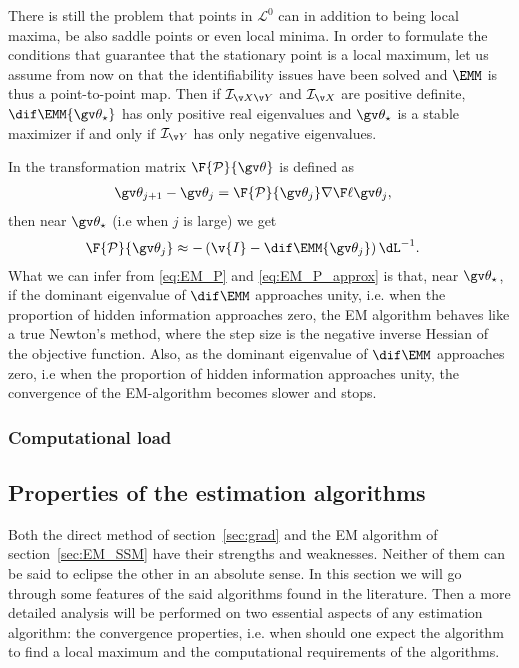 There is still the problem that points in $\mathcal{L}^0$ can in addition
to being local maxima, be also saddle points or even local minima. In order to formulate
the conditions that guarantee that the stationary point is a local maximum, let us assume
from now on that the identifiability issues have been solved and $\EMM$ is thus a point-to-point map.
Then if $\mathcal{I}_{\X\Y}$ and $\mathcal{I}_{\X}$ are positive definite,
$\dif\EMM{\Th_\star}$ has only positive real eigenvalues and $\Th_\star$ is a
stable maximizer if and only if $\mathcal{I}_{\Y}$ has only negative eigenvalues.

In \textcite{Salakhutdinov2003,Salakhutdinov2004} the transformation matrix $\F{\mathcal P}{\Th}$ is defined as
\begin{align}
	\Th_{j+1}-\Th_j &= \F{\mathcal P}{\Th_j}\nabla\lLH[\Th_j],
	\label{eq:EM_P}
\end{align}
then near $\Th_\star$ (i.e when $j$ is large)
we get
\begin{align}
		\F{\mathcal P}{\Th_j}&\approx -\left(\v{I}-\dif\EMM{\Th_j}\right)\dL^{-1}.
		\label{eq:EM_P_approx}
\end{align}
What we can infer from \eqref{eq:EM_P} and \eqref{eq:EM_P_approx} is that, near $\Th_\star$, if the dominant eigenvalue
of $\dif\EMM$ approaches unity, i.e. when the proportion of hidden information approaches zero, the EM algorithm behaves like 
a true Newton's method, where the step size is the negative inverse Hessian of the objective function. Also, as the dominant 
eigenvalue of $\dif\EMM$ approaches zero, i.e when the proportion of hidden information approaches unity, the convergence 
of the EM-algorithm becomes slower and stops. 


\parencite{Wu1983,Sandell1978,Meng1997,Elliott1999,Salakhutdinov2003a,Salakhutdinov2003,Olsson2007,Paninski2010}

\subsubsection{Computational load}

\parencite{Harvey1990,Watson1983,Cappe2005,Saatci2011,Olsson2007,Salakhutdinov2003a}


\subsection{Properties of the estimation algorithms}

Both the direct method of section~\ref{sec:grad} and the EM algorithm of section~\ref{sec:EM_SSM}
have their strengths and weaknesses. Neither of them can be said to eclipse the other in an absolute sense.
In this section we will go through some features of the said algorithms found in the literature.
Then a more detailed analysis will be performed on two essential aspects of any estimation algorithm:
the convergence properties, i.e. when should one expect the algorithm to find a local maximum and
the computational requirements of the algorithms.

